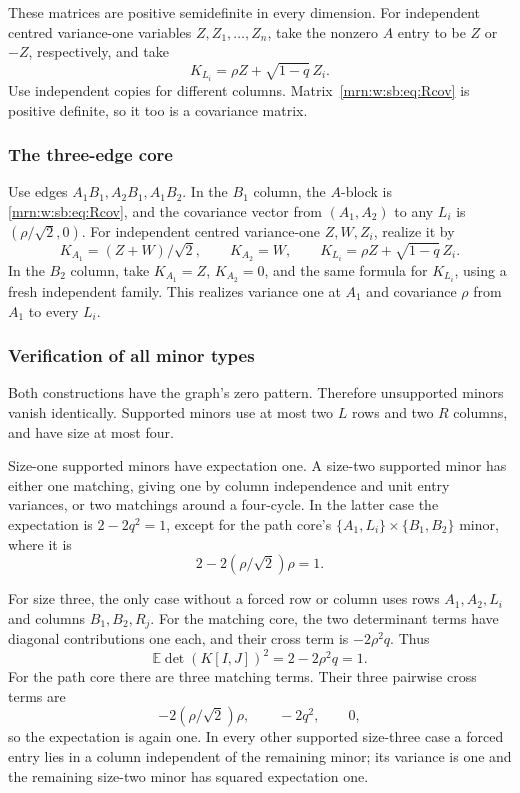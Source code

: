\documentclass[11pt,a4paper]{article}
\theoremstyle{remark}\newtheorem{remark}[theorem]{Remark}
\newcommand{\EE}{\mathbb E}                %
\begin{document}
These matrices are positive semidefinite in every dimension. For independent centred variance-one variables $Z,Z_1,\ldots,Z_n$, take the nonzero $A$ entry to be $Z$ or $-Z$, respectively, and take
\[
 K_{L_i}=\rho Z+\sqrt{1-q}\,Z_i.
\]
Use independent copies for different columns. Matrix~\eqref{mrn:w:sb:eq:Rcov} is positive definite, so it too is a covariance matrix.

\subsubsection{The three-edge core}
Use edges $A_1B_1,A_2B_1,A_1B_2$. In the $B_1$ column, the $A$-block is \eqref{mrn:w:sb:eq:Rcov}, and the covariance vector from $(A_1,A_2)$ to any $L_i$ is $(\rho/\sqrt2,0)$. For independent centred variance-one $Z,W,Z_i$, realize it by
\[
 K_{A_1}=(Z+W)/\sqrt2,\qquad K_{A_2}=W,
 \qquad K_{L_i}=\rho Z+\sqrt{1-q}\,Z_i.
\]
In the $B_2$ column, take $K_{A_1}=Z$, $K_{A_2}=0$, and the same formula for $K_{L_i}$, using a fresh independent family. This realizes variance one at $A_1$ and covariance $\rho$ from $A_1$ to every $L_i$.

\subsubsection{Verification of all minor types}
Both constructions have the graph's zero pattern. Therefore unsupported minors vanish identically. Supported minors use at most two $L$ rows and two $R$ columns, and have size at most four.

Size-one supported minors have expectation one. A size-two supported minor has either one matching, giving one by column independence and unit entry variances, or two matchings around a four-cycle. In the latter case the expectation is $2-2q^2=1$, except for the path core's $\{A_1,L_i\}\times\{B_1,B_2\}$ minor, where it is
\[
 2-2(\rho/\sqrt2)\rho=1.
\]

For size three, the only case without a forced row or column uses rows $A_1,A_2,L_i$ and columns $B_1,B_2,R_j$. For the matching core, the two determinant terms have diagonal contributions one each, and their cross term is $-2\rho^2q$. Thus
\[
 \EE\det(K[I,J])^2=2-2\rho^2q=1.
\]
For the path core there are three matching terms. Their three pairwise cross terms are
\[
 -2(\rho/\sqrt2)\rho,\qquad -2q^2,\qquad 0,
\]
so the expectation is again one. In every other supported size-three case a forced entry lies in a column independent of the remaining minor; its variance is one and the remaining size-two minor has squared expectation one.
\end{document}
